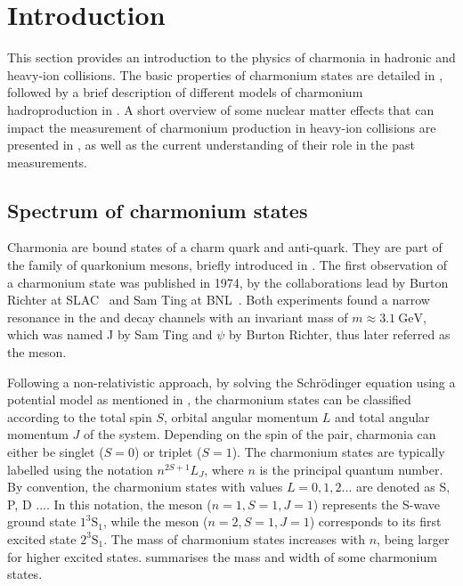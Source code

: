 \section{Introduction}\label{sec:Charmonia_Theory}

This section provides an introduction to the physics of charmonia in hadronic and heavy-ion collisions. The basic properties of charmonium states are detailed in , followed by a brief description of different models of charmonium hadroproduction in . A short overview of some nuclear matter effects that can impact the measurement of charmonium production in heavy-ion collisions are presented in , as well as the current understanding of their role in the past measurements.

\subsection{Spectrum of charmonium states}\label{sec:Charmonia_Theory_CharmoniumStates}

Charmonia are bound states of a charm quark and anti-quark. They are part of the family of quarkonium mesons, briefly introduced in . The first observation of a charmonium state was published in 1974, by the collaborations lead by Burton Richter at SLAC~\cite{JPsiDiscovery_2} and Sam Ting at BNL~\cite{JPsiDiscovery}. Both experiments found a narrow resonance in the \elel and \mumu decay channels with an invariant mass of $m \approx \SI{3.1}{\GeV}$, which was named J by Sam Ting and $\psi$ by Burton Richter, thus later referred as the \JPsi meson.

Following a non-relativistic approach, by solving the Schr{\"o}dinger equation using a \ccbar potential model as mentioned in , the charmonium states can be classified according to the total spin $S$, orbital angular momentum $L$ and total angular momentum $J$ of the \ccbar system.  Depending on the spin of the \ccbar pair, charmonia can either be singlet ($S = 0$) or triplet ($S = 1$). The charmonium states are typically labelled using the notation $n^{2S+1}L_{J}$, where $n$ is the principal quantum number. By convention, the charmonium states with values $L = 0, 1, 2 ...$ are denoted as {S, P, D ...}. In this notation, the \JPsi meson ($n=1, S=1, J=1$) represents the S-wave ground state $1^{3}\text{S}_{1}$, while the \PsiP meson ($n=2, S=1, J=1$) corresponds to its first excited state $2^{3}\text{S}_{1}$. The mass of charmonium states increases with $n$, being larger for higher excited states.  summarises the mass and width of some charmonium states.

